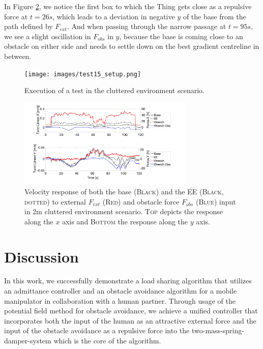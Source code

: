 In Figure \ref{pics:test15}, we notice the first box to which the Thing gets close as a repulsive force at $t = 26s$, which leads to a deviation in negative $y$ of the base from the path defined by $F_{ext}$. And when passing through the narrow passage at $t = 95s$, we see a slight oscillation in $F_{obs}$ in $y$, because the base is coming close to an obstacle on either side and needs to settle down on the best gradient centreline in between.
\begin{figure}
   \centering
   \texttt{[image: images/test15\_setup.png]}
   \caption{Execution of a test in the cluttered environment scenario.}
   \label{pics:test15_setup}
\end{figure}

\begin{figure}
   \centering
   \includegraphics[width=0.75\textwidth]{images/test15_response.jpg}
   \caption{Velocity response of both the base (\textsc{Black}) and the EE (\textsc{Black, dotted}) to external $F_{ext }$ (\textsc{Red}) and obstacle force $F_{obs}$ (\textsc{Blue}) input in \unit{2}{m} cluttered environment scenario. \textsc{Top} depicts the response along the $x$ axis and \textsc{Bottom} the response along the $y$ axis.}
   \label{pics:test15}
\end{figure}

\chapter{Discussion}
In this work, we successfully demonstrate a load sharing algorithm that utilizes an admittance controller and an obstacle avoidance algorithm for a mobile manipulator in collaboration with a human partner. Through usage of the potential field method for obstacle avoidance, we achieve a unified controller that incorporates both the input of the human as an attractive external force and the input of the obstacle avoidance as a repulsive force into the two-mass-spring-damper-system which is the core of the algorithm.

